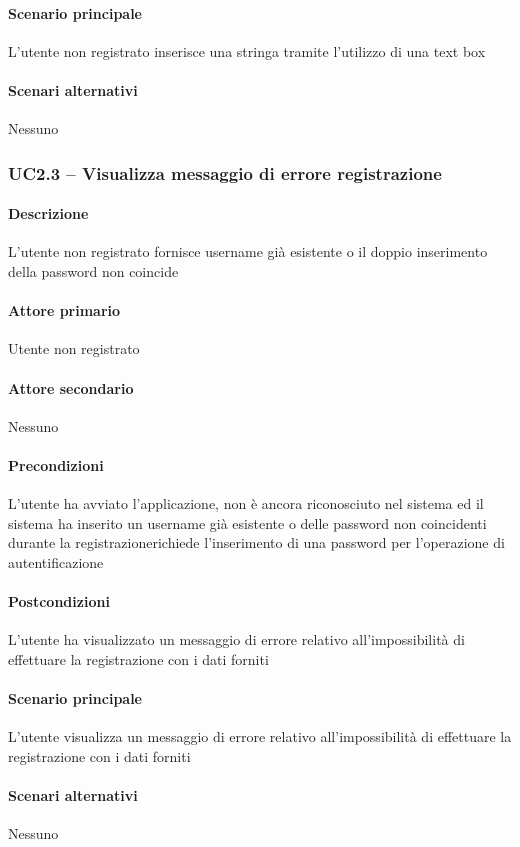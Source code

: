 \paragraph{Scenario principale}  
L’utente non registrato inserisce una stringa tramite l’utilizzo di una text box
\paragraph{Scenari alternativi}  Nessuno



\subsubsection{UC2.3 – Visualizza messaggio di errore registrazione}
\paragraph{Descrizione}  L’utente non registrato fornisce username già esistente o il doppio inserimento della password non coincide
\paragraph{Attore primario}  Utente non registrato
\paragraph{Attore secondario}  Nessuno
\paragraph{Precondizioni}  L’utente ha avviato l’applicazione, non è ancora riconosciuto nel sistema ed il sistema ha inserito un username già esistente o delle password non coincidenti durante la registrazionerichiede l’inserimento di una password per l’operazione di autentificazione
\paragraph{Postcondizioni}  L’utente ha visualizzato un messaggio di errore relativo all’impossibilità di effettuare la registrazione con i dati forniti
\paragraph{Scenario principale}  
L’utente visualizza un messaggio di errore relativo all’impossibilità di effettuare la registrazione con i dati forniti
\paragraph{Scenari alternativi}  Nessuno



